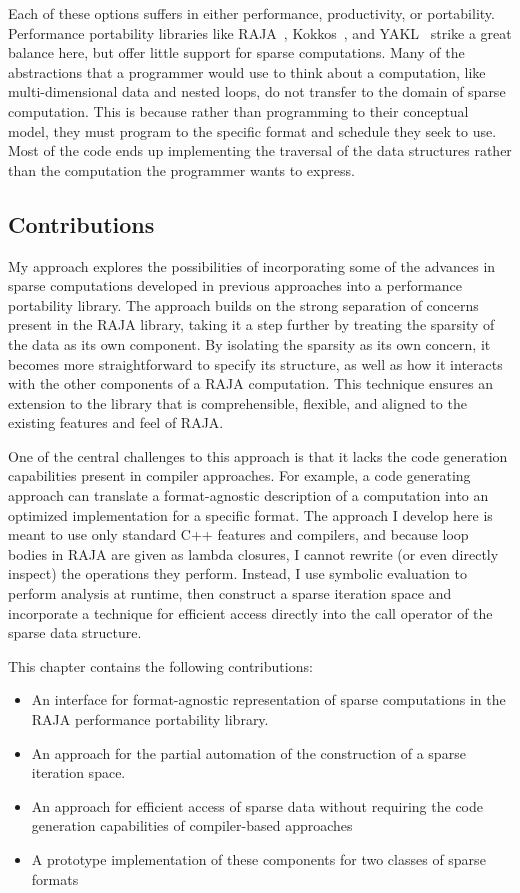 Each of these options suffers in either performance, productivity, or portability.
Performance portability libraries like RAJA~\cite{hornung2014RAJA}, Kokkos~\cite{edwards2014kokkos}, and YAKL~\cite{norman2022portable} strike a great balance here, but offer little support for sparse computations.
Many of the abstractions that a programmer would use to think about a computation, like multi-dimensional data and nested loops, do not transfer to the domain of sparse computation.
This is because rather than programming to their conceptual model, they must program to the specific format and schedule they seek to use.
Most of the code ends up implementing the traversal of the data structures rather than the computation the programmer wants to express.

\subsection{Contributions}

My approach explores the possibilities of incorporating some of the advances in sparse computations developed in previous approaches into a performance portability library.
The approach builds on the strong separation of concerns present in the RAJA library, taking it a step further by treating the sparsity of the data as its own component.
By isolating the sparsity as its own concern, it becomes more straightforward to specify its structure, as well as how it interacts with the other components of a RAJA computation.
This technique ensures an extension to the library that is comprehensible, flexible, and aligned to the existing features and feel of RAJA.

One of the central challenges to this approach is that it lacks the code generation capabilities present in compiler approaches.
For example, a code generating approach can translate a format-agnostic description of a computation into an optimized implementation for a specific format.
The approach I develop here is meant to use only standard C++ features and compilers, and because loop bodies in RAJA are given as lambda closures, I cannot rewrite (or even directly inspect) the operations they perform.
Instead, I use symbolic evaluation to perform analysis at runtime, then construct a sparse iteration space and incorporate a technique for efficient access directly into the call operator of the sparse data structure.

This chapter contains the following contributions:
\begin{itemize}
\item An interface for format-agnostic representation of sparse computations in the RAJA performance portability library.
\item An approach for the partial automation of the construction of a sparse iteration space.
\item An approach for efficient access of sparse data without requiring the code generation capabilities of compiler-based approaches
\item A prototype implementation of these components for two classes of sparse formats
\end{itemize}


